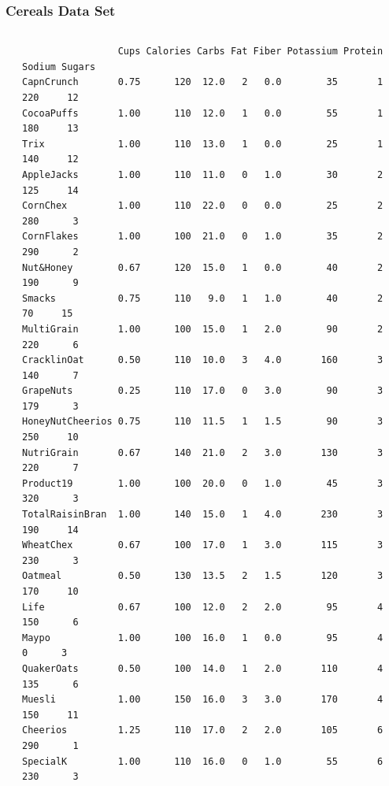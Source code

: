 \documentclass[12pt]{beamer}\usepackage[]{graphicx}\usepackage[]{color}
\makeatletter
\newenvironment{kframe}{%
 \def\at@end@of@kframe{}%
 \ifinner\ifhmode%
  \def\at@end@of@kframe{\end{minipage}}%
  \begin{minipage}{\columnwidth}%
 \fi\fi%
 \def\FrameCommand##1{\hskip\@totalleftmargin \hskip-\fboxsep
 \colorbox{shadecolor}{##1}\hskip-\fboxsep
     \hskip-\linewidth \hskip-\@totalleftmargin \hskip\columnwidth}%
 \MakeFramed {\advance\hsize-\width
   \@totalleftmargin\z@ \linewidth\hsize
   \@setminipage}}%
 {\par\unskip\endMakeFramed%
 \at@end@of@kframe}
\newenvironment{knitrout}{}{} %
\makeatother
\begin{document}

\begin{frame}[fragile]
\frametitle{Cereals Data Set}

\begin{columns}[t]
\begin{column}{0.1\textwidth}
\end{column}
\begin{column}{0.8\textwidth}
\begin{knitrout}\tiny
{}\color{fgcolor}\begin{kframe}
\begin{verbatim}
                 Cups Calories Carbs Fat Fiber Potassium Protein Sodium Sugars
CapnCrunch       0.75      120  12.0   2   0.0        35       1    220     12
CocoaPuffs       1.00      110  12.0   1   0.0        55       1    180     13
Trix             1.00      110  13.0   1   0.0        25       1    140     12
AppleJacks       1.00      110  11.0   0   1.0        30       2    125     14
CornChex         1.00      110  22.0   0   0.0        25       2    280      3
CornFlakes       1.00      100  21.0   0   1.0        35       2    290      2
Nut&Honey        0.67      120  15.0   1   0.0        40       2    190      9
Smacks           0.75      110   9.0   1   1.0        40       2     70     15
MultiGrain       1.00      100  15.0   1   2.0        90       2    220      6
CracklinOat      0.50      110  10.0   3   4.0       160       3    140      7
GrapeNuts        0.25      110  17.0   0   3.0        90       3    179      3
HoneyNutCheerios 0.75      110  11.5   1   1.5        90       3    250     10
NutriGrain       0.67      140  21.0   2   3.0       130       3    220      7
Product19        1.00      100  20.0   0   1.0        45       3    320      3
TotalRaisinBran  1.00      140  15.0   1   4.0       230       3    190     14
WheatChex        0.67      100  17.0   1   3.0       115       3    230      3
Oatmeal          0.50      130  13.5   2   1.5       120       3    170     10
Life             0.67      100  12.0   2   2.0        95       4    150      6
Maypo            1.00      100  16.0   1   0.0        95       4      0      3
QuakerOats       0.50      100  14.0   1   2.0       110       4    135      6
Muesli           1.00      150  16.0   3   3.0       170       4    150     11
Cheerios         1.25      110  17.0   2   2.0       105       6    290      1
SpecialK         1.00      110  16.0   0   1.0        55       6    230      3
\end{verbatim}
\end{kframe}
\end{knitrout}
\end{column}
\begin{column}{0.1\textwidth}
\end{column}
\end{columns}

\end{frame}
\end{document}
